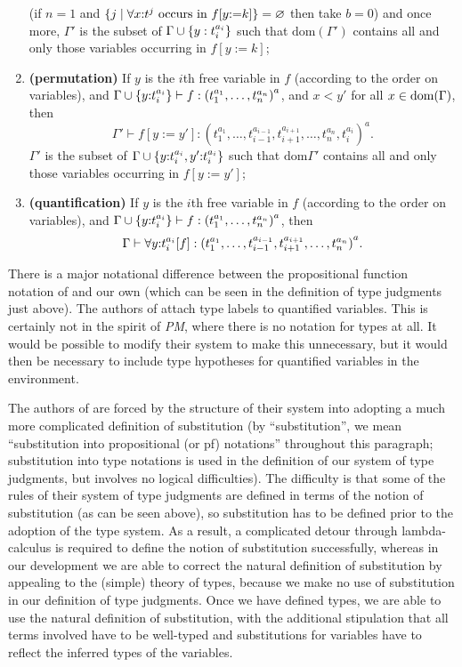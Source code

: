 \documentclass{article}
\begin{document}
\begin{enumerate}
(if
        $n=1$ and $\{j\mid \forall x{:}t^j\mbox{ occurs in } f[y{:=}k]\}
        =\varnothing$ then take $b=0$) and once more, $\Gamma'$ is the subset of
        $\Gamma\cup\{y:t_i^{a_i}\}$ such that $\mbox{dom}(\Gamma')$
        contains all and only those variables  occurring in
        $f[y{:=}k]$;
\item\label{rtt7} {\bf (permutation)}
        If $y$ is the $i$th free variable in $f$ (according to
        the order on variables), and $\Gamma\cup\{y{:}t_i^{a_i}\}\vdash
        f:{(t_1^{a_1},\dots,t_n^{a_n})}^a$, and $x<y'$ for all
        $x\in\mbox{\rm dom}(\Gamma)$, then $$\Gamma'\vdash f[y{:=}y'] :
        {(t_1^{a_1},\dots,t_{i-1}^{a_{i-1}},
        t_{i+1}^{a_{i+1}},\dots,t_n^{a_n},t_i^{a_i})}^a.$$
        $\Gamma'$ is the subset of $\Gamma\cup\{y{:}t_i^{a_i},
        y'{:}t_i^{a_i}\}$
        such that $\mbox{dom}{\Gamma'}$ contains all and only those variables 
        occurring in $f[y{:=}y']$;
\item\label{rtt8} {\bf (quantification)}
        If $y$ is the $i$th free variable in $f$ (according
        to the order on variables), and $\Gamma\cup\{y{:}t_i^{a_i}\}
        \vdash f:{(t_1^{a_1},\dots,t_n^{a_n})}^a$, then
        $$\Gamma\vdash \forall y{:}t_i^{a_i}[f] :
        {(t_1^{a_1},\dots,t_{i-1}^{a_{i-1}},
        t_{i+1}^{a_{i+1}},\dots,t_n^{a_n})}^a.$$
\end{enumerate}

There is a major notational difference between the propositional
function notation of \cite{types40} and our own (which can be seen in
the definition of type judgments just above).  The authors of
\cite{types40} attach type labels to quantified variables.  This is
certainly not in the spirit of {\em PM\/}, where there is no notation
for types at all.  It would be possible to modify their system to make
this unnecessary, but it would then be necessary to include type
hypotheses for quantified variables in the environment.

The authors of \cite{types40} are forced by the structure of their
system into adopting a much more complicated definition of
substitution (by ``substitution'', we mean ``substitution into
propositional (or pf) notations'' throughout this paragraph;
substitution into type notations is used in the definition of our
system of type judgments, but involves no logical difficulties).  The
difficulty is that some of the rules of their system of type judgments
are defined in terms of the notion of substitution (as can be seen
above), so substitution has to be defined prior to the adoption of the
type system.  As a result, a complicated detour through
lambda-calculus is required to define the notion of substitution
successfully, whereas in our development we are able to correct the
natural definition of substitution by appealing to the (simple) theory
of types, because we make no use of substitution in our definition of
type judgments.  Once we have defined types, we are able to use the
natural definition of substitution, with the additional stipulation
that all terms involved have to be well-typed and substitutions
for variables have to reflect the inferred types of the variables.
\end{document}
